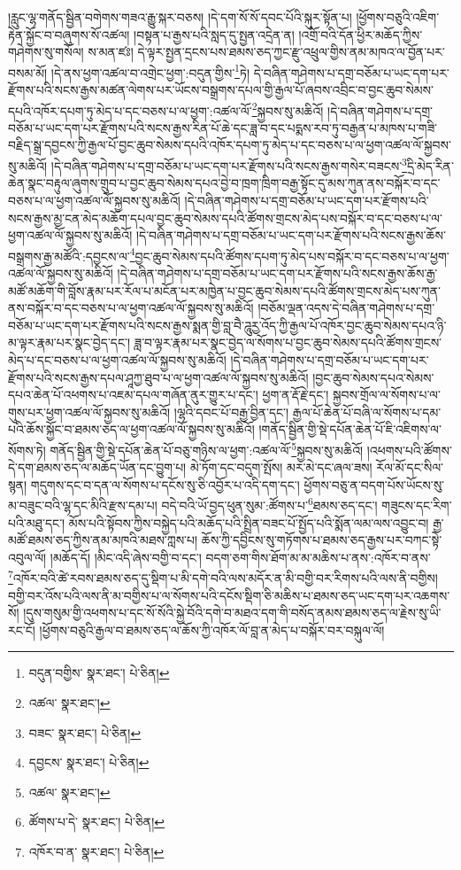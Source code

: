 །རླུང་ལྷ་གནོད་སྦྱིན་བགེགས་གཟའ་རྒྱུ་སྐར་བཅས། །དེ་དག་སོ་སོ་དབང་པོའི་སྐུར་སྟོན་པ། །ཕྱོགས་བཅུའི་འཇིག་རྟེན་སྐྱོང་བ་བཞུགས་སོ་འཚལ། །བསྟན་པ་རྒྱས་པའི་སླད་དུ་སྤྱན་འདྲེན་ན། །འགྲོ་བའི་དོན་ཕྱིར་མཆོད་ཀྱིས་གཤེགས་སུ་གསོལ། ས་མན་ཛཿ། དེ་ལྟར་སྤྱན་དྲངས་པས་ཐམས་ཅད་ཀྱང་རྫུ་འཕྲུལ་གྱིས་ནམ་མཁའ་ལ་བྱོན་པར་བསམ་མོ། །དེ་ནས་ཕྱག་འཚལ་བ་འགྲེང་ཕྱག་:བདུན་གྱིས་\footnote{བདུན་བགྱིས་  སྣར་ཐང་།  པེ་ཅིན། }ཏེ། དེ་བཞིན་གཤེགས་པ་དགྲ་བཅོམ་པ་ཡང་དག་པར་རྫོགས་པའི་སངས་རྒྱས་མཚན་ལེགས་པར་ཡོངས་བསྒྲགས་དཔལ་གྱི་རྒྱལ་པོ་ཞབས་འབྲིང་བ་བྱང་ཆུབ་སེམས་དཔའི་འཁོར་དཔག་ཏུ་མེད་པ་དང་བཅས་པ་ལ་ཕྱག་:འཚལ་ལོ་\footnote{འཚལ་  སྣར་ཐང་། }སྐྱབས་སུ་མཆིའོ། །དེ་བཞིན་གཤེགས་པ་དགྲ་བཅོམ་པ་ཡང་དག་པར་རྫོགས་པའི་སངས་རྒྱས་རིན་པོ་ཆེ་དང་ཟླ་བ་དང་པདྨས་རབ་ཏུ་བརྒྱན་པ་མཁས་པ་གཟི་བརྗིད་སྒྲ་དབྱངས་ཀྱི་རྒྱལ་པོ་བྱང་ཆུབ་སེམས་དཔའི་འཁོར་དཔག་ཏུ་མེད་པ་དང་བཅས་པ་ལ་ཕྱག་འཚལ་ལོ་སྐྱབས་སུ་མཆིའོ། །དེ་བཞིན་གཤེགས་པ་དགྲ་བཅོམ་པ་ཡང་དག་པར་རྫོགས་པའི་སངས་རྒྱས་གསེར་བཟངས་\footnote{བཟང་  སྣར་ཐང་།  པེ་ཅིན། }དྲི་མེད་རིན་ཆེན་སྣང་བརྟུལ་ཞུགས་གྲུབ་པ་བྱང་ཆུབ་སེམས་དཔའ་བྱེ་བ་ཁྲག་ཁྲིག་བརྒྱ་སྟོང་དུ་མས་ཀུན་ནས་བསྐོར་བ་དང་བཅས་པ་ལ་ཕྱག་འཚལ་ལོ་སྐྱབས་སུ་མཆིའོ། །དེ་བཞིན་གཤེགས་པ་དགྲ་བཅོམ་པ་ཡང་དག་པར་རྫོགས་པའི་སངས་རྒྱས་མྱ་ངན་མེད་མཆོག་དཔལ་བྱང་ཆུབ་སེམས་དཔའི་ཚོགས་གྲངས་མེད་པས་བསྐོར་བ་དང་བཅས་པ་ལ་ཕྱག་འཚལ་ལོ་སྐྱབས་སུ་མཆིའོ། །དེ་བཞིན་གཤེགས་པ་དགྲ་བཅོམ་པ་ཡང་དག་པར་རྫོགས་པའི་སངས་རྒྱས་ཆོས་བསྒྲགས་རྒྱ་མཚོའི་:དབྱངས་ལ་\footnote{དབྱངས་  སྣར་ཐང་།  པེ་ཅིན། }བྱང་ཆུབ་སེམས་དཔའི་ཚོགས་དཔག་ཏུ་མེད་པས་བསྐོར་བ་དང་བཅས་པ་ལ་ཕྱག་འཚལ་ལོ་སྐྱབས་སུ་མཆིའོ། །དེ་བཞིན་གཤེགས་པ་དགྲ་བཅོམ་པ་ཡང་དག་པར་རྫོགས་པའི་སངས་རྒྱས་ཆོས་རྒྱ་མཚོ་མཆོག་གི་བློས་རྣམ་པར་རོལ་པ་མངོན་པར་མཁྱེན་པ་བྱང་ཆུབ་སེམས་དཔའི་ཚོགས་གྲངས་མེད་པས་ཀུན་ནས་བསྐོར་བ་དང་བཅས་པ་ལ་ཕྱག་འཚལ་ལོ་སྐྱབས་སུ་མཆིའོ། །བཅོམ་ལྡན་འདས་དེ་བཞིན་གཤེགས་པ་དགྲ་བཅོམ་པ་ཡང་དག་པར་རྫོགས་པའི་སངས་རྒྱས་སྨན་གྱི་བླ་བཻ་ཌཱུརྱ་འོད་ཀྱི་རྒྱལ་པོ་འཁོར་བྱང་ཆུབ་སེམས་དཔའ་ཉི་མ་ལྟར་རྣམ་པར་སྣང་བྱེད་དང་། ཟླ་བ་ལྟར་རྣམ་པར་སྣང་བྱེད་ལ་སོགས་པ་བྱང་ཆུབ་སེམས་དཔའི་ཚོགས་གྲངས་མེད་པ་དང་བཅས་པ་ལ་ཕྱག་འཚལ་ལོ་སྐྱབས་སུ་མཆིའོ། །དེ་བཞིན་གཤེགས་པ་དགྲ་བཅོམ་པ་ཡང་དག་པར་རྫོགས་པའི་སངས་རྒྱས་དཔལ་ཤཱཀྱ་ཐུབ་པ་ལ་ཕྱག་འཚལ་ལོ་སྐྱབས་སུ་མཆིའོ། །བྱང་ཆུབ་སེམས་དཔའ་སེམས་དཔའ་ཆེན་པོ་འཕགས་པ་འཇམ་དཔལ་གཞོན་ནུར་གྱུར་པ་དང་། ཕྱག་ན་རྡོ་རྗེ་དང་། སྐྱབས་གྲོལ་ལ་སོགས་པ་ལ་གུས་པར་ཕྱག་འཚལ་ལོ་སྐྱབས་སུ་མཆིའོ། །ལྷའི་དབང་པོ་བརྒྱ་བྱིན་དང་། རྒྱལ་པོ་ཆེན་པོ་བཞི་ལ་སོགས་པ་དམ་པའི་ཆོས་སྐྱོང་བ་ཐམས་ཅད་ལ་ཕྱག་འཚལ་ལོ་སྐྱབས་སུ་མཆིའོ། །གནོད་སྦྱིན་གྱི་སྡེ་དཔོན་ཆེན་པོ་ཇི་འཇིགས་ལ་སོགས་ཏེ། གནོད་སྦྱིན་གྱི་སྡེ་དཔོན་ཆེན་པོ་བཅུ་གཉིས་ལ་ཕྱག་:འཚལ་ལོ་\footnote{འཚལ་  སྣར་ཐང་། }སྐྱབས་སུ་མཆིའོ། །འཕགས་པའི་ཚོགས་དེ་དག་ཐམས་ཅད་ལ་མཆོད་ཡོན་དང་བྱུག་པ། མེ་ཏོག་དང་བདུག་སྤོས། མར་མེ་དང་ཞལ་ཟས། རོལ་མོ་དང་སིལ་སྙན། གདུགས་དང་བ་དན་ལ་སོགས་པ་དངོས་སུ་ཅི་འབྱོར་པ་འདི་དག་དང་། ཕྱོགས་བཅུ་ན་བདག་པོས་ཡོངས་སུ་མ་བཟུང་བའི་ལྷ་དང་མིའི་རྫས་དམ་པ། བདེ་བའི་ཡོ་བྱད་ཕུན་སུམ་:ཚོགས་པ་\footnote{ཚོགས་པ་དེ་  སྣར་ཐང་།  པེ་ཅིན། }ཐམས་ཅད་དང་། གཟུངས་དང་རིག་པའི་མཐུ་དང་། མོས་པའི་སྟོབས་ཀྱིས་བསྐྱེད་པའི་མཆོད་པའི་སྤྲིན་བཟང་པོ་སྤྱོད་པའི་སྨོན་ལམ་ལས་འབྱུང་བ། རྒྱ་མཚོ་ཐམས་ཅད་ཀྱིས་ནམ་མཁའི་མཐས་ཀླས་པ། ཆོས་ཀྱི་དབྱིངས་སུ་གཏོགས་པ་ཐམས་ཅད་རྒྱས་པར་བཀང་སྟེ་འབུལ་ལོ། །མཆོད་དོ། །མིང་འདི་ཞེས་བགྱི་བ་དང་། བདག་ཅག་གིས་ཐོག་མ་མ་མཆིས་པ་ནས་:འཁོར་བ་ནས་\footnote{འཁོར་བ་ན་  སྣར་ཐང་།  པེ་ཅིན། }འཁོར་བའི་ཚེ་རབས་ཐམས་ཅད་དུ་སྡིག་པ་མི་དགེ་བའི་ལས་མདོར་ན་མི་བགྱི་བར་རིགས་པའི་ལས་ནི་བགྱིས། བགྱི་བར་འོས་པའི་ལས་ནི་མ་བགྱིས་པ་ལ་སོགས་པའི་དངོས་སྡིག་ཅི་མཆིས་པ་ཐམས་ཅད་ཡང་དག་པར་འཆགས་སོ། །དུས་གསུམ་གྱི་འཕགས་པ་དང་སོ་སོའི་སྐྱེ་བོའི་དགེ་བ་མཐའ་དག་གི་བསོད་ནམས་ཐམས་ཅད་ལ་རྗེས་སུ་ཡི་རང་ངོ། །ཕྱོགས་བཅུའི་རྒྱལ་བ་ཐམས་ཅད་ལ་ཆོས་ཀྱི་འཁོར་ལོ་བླ་ན་མེད་པ་བསྐོར་བར་བསྐུལ་ལོ། 